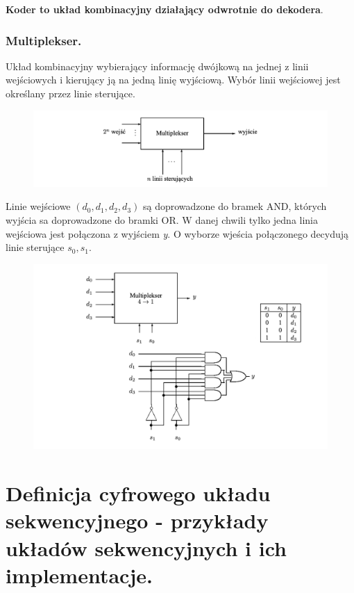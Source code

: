 \documentclass[12pt]{article}
\begin{document}
    \textbf{Koder to układ kombinacyjny działający odwrotnie do dekodera}.

    \subsubsection{Multiplekser.}
    Układ kombinacyjny wybierający informację dwójkową na jednej z linii wejściowych i kierujący ją na jedną linię
    wyjściową. Wybór linii wejściowej jest określany przez linie sterujące.

    \begin{figure}[H]
        \includegraphics[width=\linewidth]{uk/mul.png}
    \end{figure}

    Linie wejściowe $(d_0, d_1, d_2, d_3)$ są doprowadzone do bramek AND, których wyjścia sa doprowadzone do bramki
    OR. W danej chwili tylko jedna linia wejściowa jest połączona z wyjściem \textit{y}. O wyborze wjeścia połączonego
    decydują linie sterujące $s_0, s_1$.

    \begin{figure}[H]
        \includegraphics[width=\linewidth]{uk/mul_l.png}
    \end{figure}

    \newpage

    \section{Definicja cyfrowego układu sekwencyjnego - przykłady układów sekwencyjnych i ich implementacje.}
    
\end{document}
